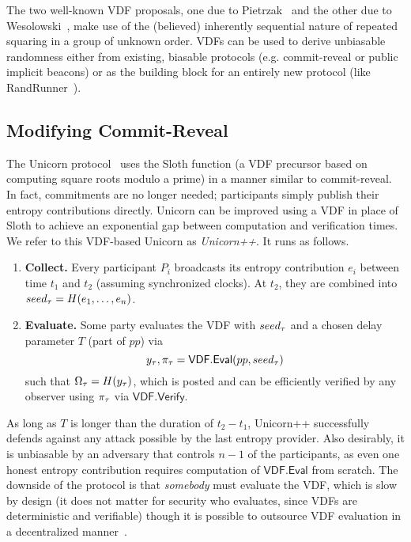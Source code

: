 The two well-known VDF proposals, one due to Pietrzak~\cite{pietrzak2018simple} and the other due to Wesolowski~\cite{wesolowski2019efficient}, make use of the (believed) inherently sequential nature of repeated squaring in a group of unknown order.
VDFs can be used to derive unbiasable randomness either from existing, biasable protocols (e.g. commit-reveal or public implicit beacons) or as the building block for an entirely new protocol (like RandRunner~\cite{schindler2021randrunner}).

\subsection{Modifying Commit-Reveal}
\label{subsection:modifying-commit-reveal}
The Unicorn protocol~\cite{lenstra2015random} uses the Sloth function (a VDF precursor based on computing square roots modulo a prime) in a manner similar to commit-reveal. In fact, commitments are no longer needed; participants simply publish their entropy contributions directly. Unicorn can be improved using a VDF in place of Sloth to achieve an exponential gap between computation and verification times. We refer to this VDF-based Unicorn as \textit{Unicorn++}. It runs as follows.
\begin{enumerate}
    \item \textbf{Collect.} Every participant $P_i$ broadcasts its entropy contribution $e_i$ between time $t_1$ and $t_2$ (assuming synchronized clocks). At $t_2$, they are combined into $seed_\tau = H(e_1,\ldots, e_n)$.
    \item \textbf{Evaluate.} Some party evaluates the VDF with $seed_\tau$ and a chosen delay parameter $T$ (part of $pp$) via
    $$y_\tau, \pi_\tau = \mathsf{VDF.Eval}(pp, seed_\tau)$$
    such that $\Omega_\tau = H(y_\tau)$, which is posted and can be efficiently verified by any observer using $\pi_\tau$ via $\mathsf{VDF.Verify}$.
\end{enumerate}

As long as $T$ is longer than the duration of $t_2 - t_1$, Unicorn++ successfully defends against any attack possible by the last entropy provider. Also desirably, it is unbiasable by an adversary that controls $n - 1$ of the participants, as even one honest entropy contribution requires computation of $\mathsf{VDF.Eval}$ from scratch. The downside of the protocol is that \emph{somebody} must evaluate the VDF, which is slow by design (it does not matter for security who evaluates, since VDFs are deterministic and verifiable) though it is possible to outsource VDF evaluation in a decentralized manner~\cite{thyagarajan2021opensquare}.

